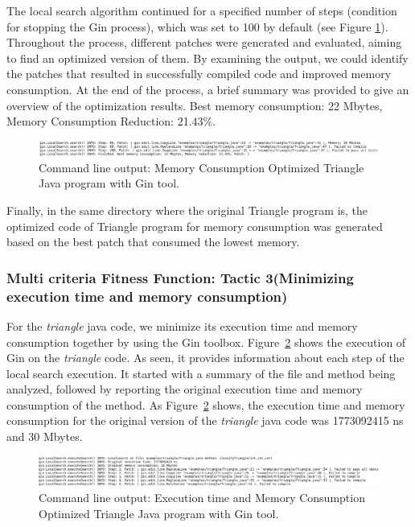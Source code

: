 \vspace{.5em}
The local search algorithm continued for a specified number of steps (condition for stopping  the Gin process), which was set to 100 by default (see Figure \ref{fig:MC_1}). Throughout the process, different patches were generated and evaluated, aiming to find an optimized version of them. By examining the output, we could identify the patches that resulted in successfully compiled code and improved memory consumption. At the end of the process, a brief summary was provided to give an overview of the optimization results. Best memory consumption: 22 Mbytes, Memory Consumption Reduction: 21.43\%.

\begin{figure}[htbp]
  \centering
  \includegraphics[width=1\textwidth]{img/Triangle_MC_1.png}
  \caption{Command line output: Memory Consumption Optimized Triangle Java program with Gin tool.}
  \label{fig:MC_1}
\end{figure}

\vspace{1em}
Finally, in the same directory where the original Triangle program is, the optimized code of Triangle program for memory consumption was generated based on the best patch that consumed the lowest memory.

\subsubsection{Multi criteria Fitness Function: Tactic 3(Minimizing execution time and memory consumption)}

For the \textit{triangle} java code, we minimize its execution time and memory consumption together by using the Gin toolbox. Figure~\ref{fig:EC_MC_1} shows the execution of Gin on the \textit{triangle} code. As seen, it provides information about each step of the local search execution. It started with a summary of the file and method being analyzed, followed by reporting the original execution time and memory consumption of the method. As Figure~\ref{fig:EC_MC_1} shows, the execution time and memory consumption for the original version of the \textit{triangle} java code was 1773092415 ns and 30 Mbytes.

\begin{figure}[htbp]
  \centering
  \includegraphics[width=1\textwidth]{img/Triangle_ET_MC_1.png}
  \caption{Command line output: Execution time and Memory Consumption Optimized Triangle Java program with Gin tool.}
  \label{fig:EC_MC_1}
\end{figure}

